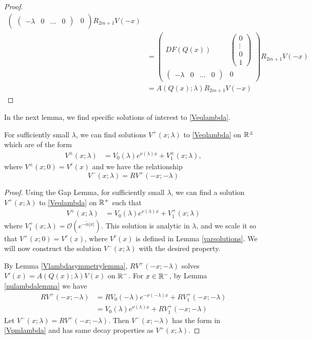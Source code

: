 \documentclass[thesis.tex]{subfiles}
\begin{document}
\begin{lemma}
\begin{proof}
\begin{align*}
\begin{pmatrix}
\begin{pmatrix} -\lambda & 0 & \dots & 0 \end{pmatrix} & 0
\end{pmatrix} R_{2m+1} V(-x) \\
&= \begin{pmatrix}
DF(Q(x)) & \begin{pmatrix} 0 \\ \vdots \\ 0 \\ 1 \end{pmatrix} \\
\begin{pmatrix} -\lambda & 0 & \dots & 0 \end{pmatrix} & 0
\end{pmatrix} R_{2m+1} V(-x) \\
&= A(Q(x); \lambda) R_{2m+1} V(-x)
\end{align*}
\end{proof}
\end{lemma}

In the next lemma, we find specific solutions of interest to \eqref{Veqlambda}.

\begin{lemma}
For sufficiently small $\lambda$, we can find solutions $V^+(x; \lambda)$ to \eqref{Veqlambda} on $\mathbb{R}^\pm$ which are of the form
\begin{align}\label{Vpmlambda}
V^\pm(x; \lambda) &= V_0(\lambda)e^{\nu(\lambda)x} + V_1^\pm(x; \lambda),
\end{align}
where $V^\pm(x; 0) = V^c(x)$ and we have the relationship
\begin{equation}\label{Vpmsymmetry}
V^-(x; \lambda) = R V^+(-x; -\lambda)
\end{equation}

\begin{proof}
Using the Gap Lemma, for sufficiently small $\lambda$, we can find a solution $V^+(x; \lambda)$ to \eqref{Veqlambda} on $\mathbb{R}^+$ such that
\begin{align*}
V^+(x; \lambda) &= V_0(\lambda)e^{\nu(\lambda)x} + V_1^+(x; \lambda)
\end{align*}
where $V_1^+(x; \lambda) = \mathcal{O}(e^{-\tilde{\alpha}|x|})$. This solution is analytic in $\lambda$, and we scale it so that $V^+(x; 0) = V^c(x)$, where $V^c(x)$ is defined in Lemma \ref{varsolutions}. We will now construct the solution $V^-(x; \lambda)$ with the desired property.

By Lemma \ref{Vlambdasymmetrylemma}, $RV^+(-x; -\lambda)$ solves $V'(x) = A(Q(x); \lambda) V(x)$ on $\mathbb{R}^-$. For $x \in \mathbb{R}^-$, by Lemma \ref{nulambdalemma} we have
\begin{align*}
RV^+(-x; -\lambda) &= R V_0(-\lambda)e^{-\nu(-\lambda)x} + R V_1^+(-x; -\lambda) \\
&= V_0(\lambda)e^{\nu(\lambda)x} + R V_1^+(-x; -\lambda)
\end{align*}
Let $V^-(x; \lambda) = RV^+(-x; -\lambda)$. Then $V^-(x; -\lambda)$ has the form in \eqref{Vpmlambda} and has same decay properties as $V^+(x; \lambda)$.
\end{proof}
\end{lemma}
\end{document}
